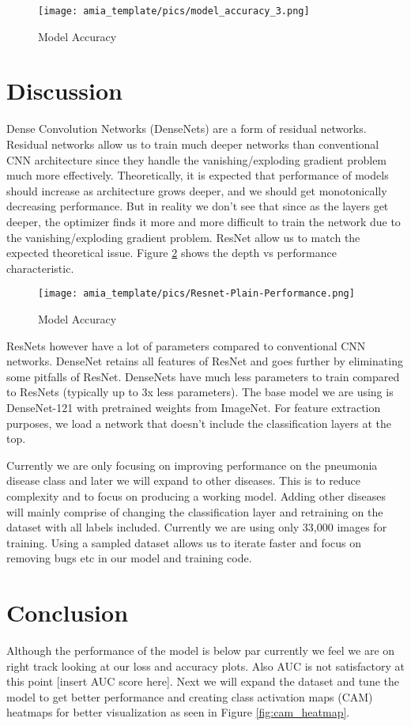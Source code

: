\documentclass{amia}
\begin{document}
\begin{figure}[h!]
\centering
\texttt{[image: amia\_template/pics/model\_accuracy\_3.png]}
\caption{Model Accuracy}
\label{fig2}
\end{figure}


\section*{Discussion}
Dense Convolution Networks (DenseNets) are a form of residual networks. Residual networks allow us to train much deeper networks than conventional CNN architecture since they handle the vanishing/exploding gradient problem much more effectively. Theoretically, it is expected that performance of models should increase as architecture grows deeper, and we should get monotonically decreasing performance. But in reality we don't see that since as the layers get deeper, the optimizer finds it more and more difficult to train the network due to the vanishing/exploding gradient problem. ResNet allow us to match the expected theoretical issue. Figure \ref{fig3} shows the depth vs performance characteristic.

\begin{figure}[h!]
\centering
\texttt{[image: amia\_template/pics/Resnet-Plain-Performance.png]}
\caption{Model Accuracy}
\label{fig3}
\end{figure}


ResNets however have a lot of parameters compared to conventional CNN networks. DenseNet retains all features of ResNet and goes further by eliminating some pitfalls of ResNet. DenseNets have much less parameters to train compared to ResNets (typically up to 3x less parameters). The base model we are using is DenseNet-121 with pretrained weights from ImageNet. For feature extraction purposes, we load a network that doesn't include the classification layers at the top.

Currently we are only focusing on improving performance on the pneumonia disease class and later we will expand to other diseases. This is to reduce complexity and to focus on producing a working model. Adding other diseases will mainly comprise of changing the classification layer and retraining on the dataset with all labels included. Currently we are using only 33,000 images for training. Using a sampled dataset allows us to iterate faster and focus on removing bugs etc in our model and training code.

\section*{Conclusion}
Although the performance of the model is below par currently we feel we are on right track looking at our loss and accuracy plots. Also AUC is not satisfactory at this point [insert AUC score here]. Next we will expand the dataset and tune the model to get better performance and creating class activation maps (CAM) heatmaps for better visualization as seen in Figure \ref{fig:cam_heatmap}.
\end{document}
